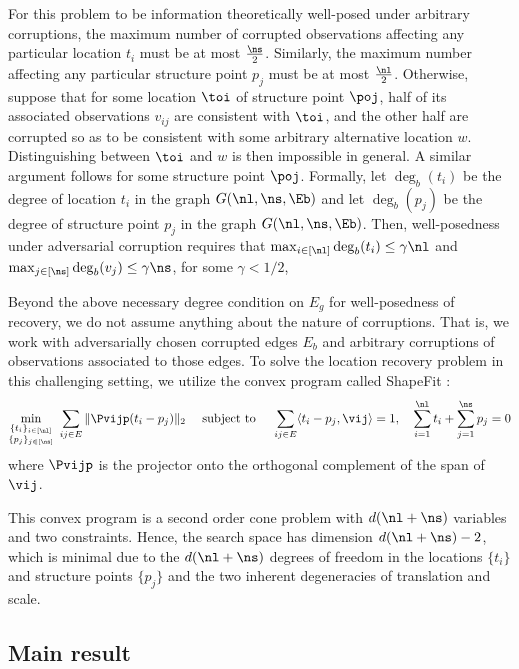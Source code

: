 For this problem to be information theoretically well-posed under arbitrary corruptions, the maximum number of corrupted observations affecting any particular location $t_i$ must be at most $\frac{\ns}{2}$.  Similarly, the maximum number affecting any particular structure point $p_j$ must be at most $\frac{\nl}{2}$.  Otherwise, suppose that for some location $\toi$ of structure point $\poj$, half of its associated observations $v_{ij}$ are consistent with $\toi$, and the other half are corrupted so as to be consistent with some arbitrary alternative location $w$. Distinguishing between $\toi$ and $w$ is then impossible in general. A similar argument follows for some structure point $\poj$. Formally, let $\deg_b(t_i)$ be the degree of location $t_i$ in the graph $G(\nl,\ns, \Eb)$ and let $\deg_b(p_j)$ be the degree of structure point $p_j$ in the graph $G(\nl,\ns, \Eb)$. Then, well-posedness under adversarial corruption requires that $\max_{i \in [\nl]} \deg_b(t_i) \leq \gamma \nl$ and $\max_{j \in [\ns]} \deg_b(v_j) \leq \gamma \ns$, for some $\gamma<1/2$,

Beyond the above necessary degree condition on $E_g$ for well-posedness of recovery, we do not assume anything about the nature of corruptions. That is, we work with adversarially chosen corrupted edges $E_b$ and arbitrary corruptions of observations associated to those edges. To solve the location recovery problem in this challenging setting, we utilize the convex program called ShapeFit \cite{HLV2015}:
\begin{align}
\min_{\substack{ \{t_i\}_{i \in [\nl]} \\ \{p_j\}_{j\in [\ns]}}} \ \sum_{ij \in E} \| \Pvijp (t_i - p_j) \|_2 \quad \text{ subject to } \quad \sum_{ij \in E} \langle t_i - p_j, \vij \rangle = 1, \ \ \  \sum_{i=1}^{\nl} t_i + \sum_{j=1}^{\ns} p_j = 0 \label{shapefit}
\end{align}
where $\Pvijp$ is the projector onto the orthogonal complement of the span of $\vij$.  

This convex program is a second order cone problem with $d(\nl + \ns)$ variables and two constraints.  Hence, the search space has dimension $d(\nl+\ns)-2$, which is minimal due to the $d(\nl + \ns)$ degrees of freedom in the locations $\{t_i\}$ and structure points $\{p_j\}$ and the two inherent degeneracies of translation and scale.

\subsection{Main result}

